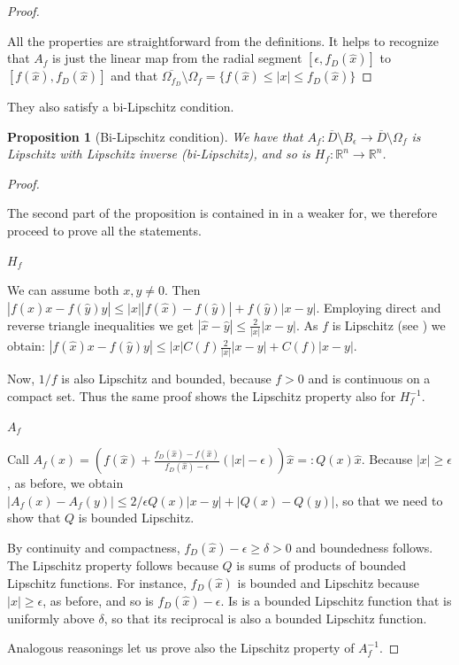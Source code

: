 \documentclass[english,a4paper,9pt,oneside]{scrbook}	%
\theoremstyle{break}
\newtheorem{prop}[equation]{Proposition}
\newenvironment{mproof}[1][\proofname]{%
  \begin{proof}[#1]$ $\par\nobreak\ignorespaces
}{%
  \end{proof}
}
\renewcommand*{\proofname}{Proof}
\theoremstyle{remark}
\newcommand{\mR}{\mathbb{R}}
\newcommand{\xh}{\hat{x}}
\newcommand{\yh}{\hat{y}}
\newcommand{\eps}{\epsilon}
\begin{document}
\begin{mproof}
All the properties are straightforward from the definitions. It helps to recognize that $A_f$ is just the linear map from the radial segment $[\eps, f_D(\xh)]$ to $[f(\xh), f_D(\xh)]$ and that $\overline{\Omega_{f_D}} \setminus \Omega_f = \{f(\xh)\leq|x|\leq f_D(\xh)\}$
\end{mproof}

They also satisfy a bi-Lipschitz condition.

\begin{prop}[Bi-Lipschitz condition]
We have that $A_f:  \overline{D}\setminus B_\eps\rightarrow \overline{D}\setminus \Omega_f $ is Lipschitz with Lipschitz inverse (bi-Lipschitz), and so is $H_f: \mR^n \rightarrow \mR^n$.
\end{prop}

\begin{mproof}

The second part of the proposition is contained in \cite{deckelnick} in a weaker for, we therefore proceed to prove all the statements.

\underline{$H_f$}

We can assume both $x,y\neq 0$. Then $|f(\xh)x-f(\yh)y|\leq |x||f(\xh)-f(\yh)|+f(\yh)|x-y|$. Employing direct and reverse triangle inequalities we get $|\xh-\yh|\leq \frac{2}{|x|}|x-y|$.
As $f$ is Lipschitz (see \cite{deckelnick}) we obtain:  $|f(\xh)x-f(\yh)y|\leq |x|C(f)\frac{2}{|x|}|x-y|+C(f)|x-y|$.

Now, $1/f$ is also Lipschitz and bounded, because $f>0$ and is continuous on a compact set. Thus the same proof shows the Lipschitz property also for $H_f^{-1}$.

\underline{$A_f$}

Call $A_f(x)=\left (  f(\xh)+\frac{f_D(\xh)-f(\xh)}{f_D(\xh)-\eps}(|x|-\eps) \right )\xh =:Q(x)\xh $. Because $|x|\geq\eps$, as before, we obtain $|A_f(x)-A_f(y)|\leq 2/\eps Q(x) |x-y|+|Q(x)-Q(y)|$, so that we need to show that $Q$ is bounded Lipschitz.

By continuity and compactness, $f_D(\xh)-\eps\geq \delta >0$ and boundedness follows. The Lipschitz property follows because $Q$ is sums of products of bounded Lipschitz functions. For instance, $f_D(\xh)$ is bounded and Lipschitz because $|x|\geq\eps$, as before, and so is $f_D(\xh)-\eps$. Is is a bounded Lipschitz function that is uniformly above $\delta$, so that its reciprocal is also a bounded Lipschitz function.

Analogous reasonings let us prove also the Lipschitz property of $A_f^{-1}$.
\end{mproof}
\end{document}
